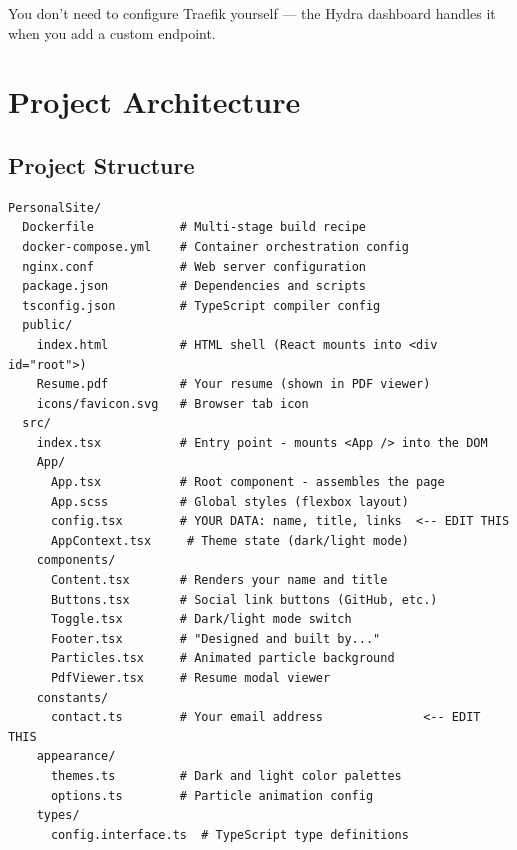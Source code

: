 \documentclass[11pt, letterpaper]{article}
\begin{document}
You don't need to configure Traefik yourself --- the Hydra dashboard handles
it when you add a custom endpoint.

\section{Project Architecture}

\subsection{Project Structure}

\begin{lstlisting}[style=terminal, caption={File tree}]
PersonalSite/
  Dockerfile            # Multi-stage build recipe
  docker-compose.yml    # Container orchestration config
  nginx.conf            # Web server configuration
  package.json          # Dependencies and scripts
  tsconfig.json         # TypeScript compiler config
  public/
    index.html          # HTML shell (React mounts into <div id="root">)
    Resume.pdf          # Your resume (shown in PDF viewer)
    icons/favicon.svg   # Browser tab icon
  src/
    index.tsx           # Entry point - mounts <App /> into the DOM
    App/
      App.tsx           # Root component - assembles the page
      App.scss          # Global styles (flexbox layout)
      config.tsx        # YOUR DATA: name, title, links  <-- EDIT THIS
      AppContext.tsx     # Theme state (dark/light mode)
    components/
      Content.tsx       # Renders your name and title
      Buttons.tsx       # Social link buttons (GitHub, etc.)
      Toggle.tsx        # Dark/light mode switch
      Footer.tsx        # "Designed and built by..."
      Particles.tsx     # Animated particle background
      PdfViewer.tsx     # Resume modal viewer
    constants/
      contact.ts        # Your email address              <-- EDIT THIS
    appearance/
      themes.ts         # Dark and light color palettes
      options.ts        # Particle animation config
    types/
      config.interface.ts  # TypeScript type definitions
\end{lstlisting}

\end{document}
